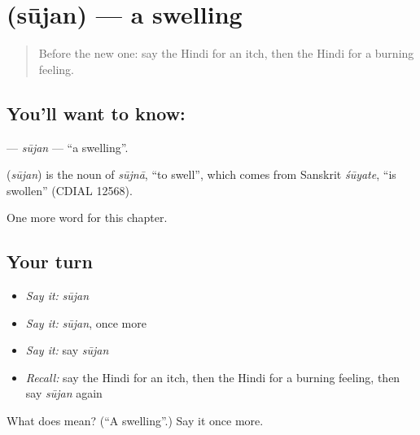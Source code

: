 \section[\texorpdfstring{\hi{सूजन} (sūjan)}{सूजन (sūjan)}]{ (sūjan) — a swelling}

\label{lesson:HI-C274-sujan}



\begin{quote}
Before the new one: say the Hindi for an itch, then the Hindi for a burning feeling.
\end{quote}

\subsection*{You'll want to know: }
\textbf{} — \emph{sūjan} — \textquotedblleft{}a swelling\textquotedblright{}.

\begin{cousinweb}
\textbf{} (\emph{sūjan}) is the noun of \emph{sūjnā}, \textquotedblleft{}to swell\textquotedblright{}, which comes from Sanskrit \emph{śūyate}, \textquotedblleft{}is swollen\textquotedblright{} (CDIAL 12568).
\end{cousinweb}

\begin{grammarlens}[title={What you've built}]
One more word for this chapter.
\end{grammarlens}

\subsection*{Your turn}
\begin{itemize}
\raggedright
  \item \emph{Say it:} \emph{sūjan}
  \item \emph{Say it:} \emph{sūjan}, once more
  \item \emph{Say it:} say \emph{sūjan}
  \item \emph{Recall:} say the Hindi for an itch, then the Hindi for a burning feeling, then say \emph{sūjan} again
\end{itemize}

\begin{tcolorbox}[breakable,colback=teal!4,colframe=teal!35!black,title={Before you move on}]
What does  mean? (\textquotedblleft{}A swelling\textquotedblright{}.) Say it once more.
\end{tcolorbox}
